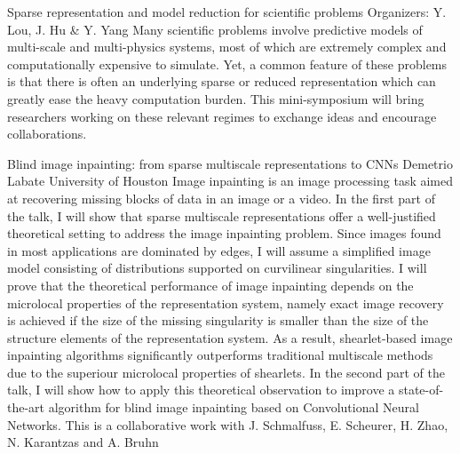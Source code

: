 \label{mini08}

\miniabs
{Sparse representation and model reduction for scientific problems}
{Organizers: Y. Lou, J. Hu \& Y. Yang}
{Many scientific problems involve predictive models of multi-scale and multi-physics systems, most of which are extremely complex and computationally expensive to simulate. Yet, a common feature of these problems is that there is often an underlying sparse or reduced representation which can greatly ease the heavy computation burden. This mini-symposium will bring researchers working on these relevant regimes to exchange ideas and encourage collaborations.}



\begin{addmargin}[2em]{0em}
\vspace{2ex}
\abs
{Blind image inpainting: from sparse multiscale representations to CNNs}
{Demetrio Labate}
{University of Houston}
{Image inpainting is an image processing task aimed at recovering missing blocks of data in an image or a video. In the first part of the talk, I will show that sparse multiscale representations offer a well-justified theoretical setting to address the image inpainting problem. Since images found in most applications are dominated by edges, I will assume a simplified image model consisting of distributions supported on curvilinear singularities. I will prove that the theoretical performance of image inpainting depends on the microlocal properties of the representation system, namely exact image recovery is achieved if the size of the missing singularity is smaller than the size of the structure elements of the representation system. As a result, shearlet-based image inpainting algorithms significantly outperforms traditional multiscale methods due to the superiour microlocal properties of shearlets. In the second part of the talk, I will show how to apply this theoretical observation to improve a state-of-the-art algorithm for blind image inpainting based on Convolutional Neural Networks.  This is a collaborative work with J. Schmalfuss, E. Scheurer, H. Zhao, N. Karantzas and A. Bruhn}



\end{addmargin}
